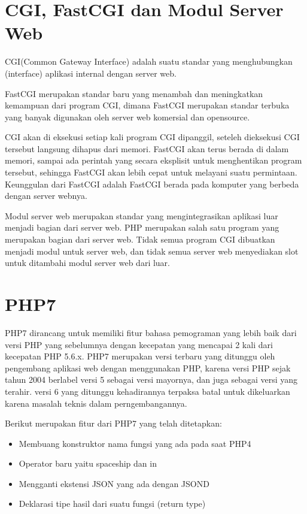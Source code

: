 \section{CGI, FastCGI dan Modul Server Web}
CGI(Common Gateway Interface) adalah suatu standar yang menghubungkan (interface) aplikasi internal dengan server web.  

FastCGI merupakan standar baru yang menambah dan meningkatkan kemampuan dari program CGI, dimana FastCGI merupakan standar  terbuka yang banyak digunakan oleh server web komersial dan opensource.

CGI akan di eksekusi setiap  kali program CGI dipanggil, seteleh dieksekusi CGI tersebut langsung dihapus dari memori. FastCGI akan terus berada di dalam memori, sampai ada perintah  yang secara eksplisit untuk menghentikan program tersebut, sehingga FastCGI akan lebih cepat untuk melayani suatu permintaan. Keunggulan dari FastCGI adalah FastCGI  berada pada komputer yang berbeda dengan server webnya.

Modul server web merupakan standar yang mengintegrasikan aplikasi luar menjadi bagian dari server web. PHP merupakan salah satu program yang merupakan bagian dari server web. Tidak semua program CGI dibuatkan menjadi modul untuk server web, dan tidak semua server web menyediakan slot untuk ditambahi modul server web dari luar. 

\section{PHP7}
PHP7 dirancang untuk memiliki fitur bahasa pemograman yang lebih baik dari versi PHP yang sebelumnya dengan kecepatan yang mencapai 2 kali dari kecepatan PHP 5.6.x. PHP7 merupakan versi terbaru yang ditunggu oleh pengembang aplikasi web dengan menggunakan PHP, karena versi PHP sejak tahun 2004 berlabel versi 5 sebagai versi mayornya, dan juga sebagai versi yang terahir. versi 6 yang ditunggu kehadirannya terpaksa batal untuk dikeluarkan karena masalah teknis dalam perngembangannya.

Berikut merupakan fitur dari PHP7 yang telah ditetapkan:
\begin{itemize}
\item Membuang konstruktor nama fungsi yang ada pada saat PHP4
\item Operator baru yaitu spaceship dan in
\item Mengganti ekstensi JSON yang ada dengan JSOND
\item Deklarasi tipe hasil dari suatu fungsi (return type)
\end{itemize}

